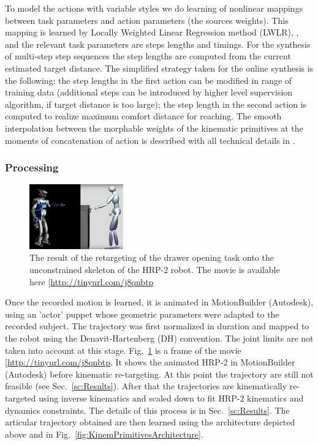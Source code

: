 To model the actions with variable styles we do learning of nonlinear mappings between task parameters and action parameters (the sources weights).
This mapping is learned by Locally Weighted Linear Regression method (LWLR), \cite{ref:mlsg15}, and the relevant task parameters are steps lengths and timings.
For the synthesis of multi-step step sequences the step lengths are computed from the current estimated target distance. The simplified strategy taken for the
online synthesis is the following: the step lengths in the first action can be modified in range of training data (additional steps can be introduced by higher level
supervision algorithm, if target distance is too large); the step length in the second action is computed to realize maximum comfort distance for reaching. The smooth interpolation between the morphable weights of the kinematic primitives at the moments of concatenation of action is described with all technical details in \cite{ref:mlsg15}.

\subsubsection*{Processing}

\begin{figure}[ht]
  \centering
  \includegraphics[width=0.36\textwidth]{RobotAvatarjpg2.jpg}
  \caption{The result of the retargeting of the drawer opening task onto the unconstrained skeleton of the HRP-2 robot. The movie is available here [\url{http://tinyurl.com/j8qnbtp}}
\label{fig:RobotHuman}
\end{figure}

Once the recorded motion is learned, it is animated in MotionBuilder (Autodesk),
using an 'actor' puppet whose geometric parameters were adapted to the recorded subject.
The trajectory was first normalized in duration and mapped to the robot using the Denavit-Hartenberg (DH) convention.
The joint limits are not taken into account at this stage.
Fig.~\ref{fig:RobotHuman} is a frame of the movie [\url{http://tinyurl.com/j8qnbtp}.
It shows the animated HRP-2 in MotionBuilder (Autodesk) before kinematic re-targeting.
At this point the trajectory are still not feasible (see Sec.~\ref{sc:Results}).
After that the trajectories are kinematically re-targeted using inverse kinematics and scaled down to fit HRP-2 kinematics and dynamics constraints.
The details of this process is in Sec.~\ref{sc:Results}.
The articular trajectory obtained are then learned using the architecture depicted above and in Fig.~\ref{fig:KinemPrimitivesArchitecture}.


